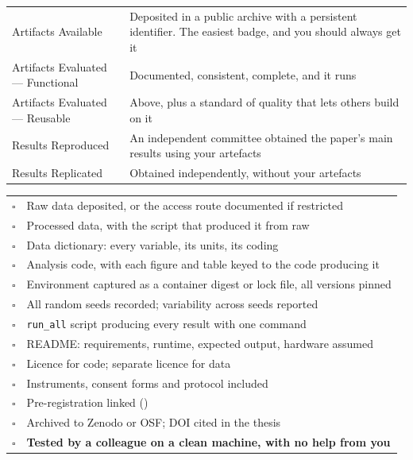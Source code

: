 \begin{center}
\small
\begin{tabular}{@{}L{4.2cm}L{10.1cm}@{}}
\toprule
Artifacts Available   & Deposited in a public archive with a persistent
                        identifier. The easiest badge, and you should always
                        get it \\
Artifacts Evaluated --- Functional & Documented, consistent, complete, and it
                        runs \\
Artifacts Evaluated --- Reusable & Above, plus a standard of quality that lets
                        others build on it \\
Results Reproduced    & An independent committee obtained the paper's main
                        results using your artefacts \\
Results Replicated    & Obtained independently, without your artefacts \\
\bottomrule
\end{tabular}
\end{center}

\begin{templatebox}
\begin{tabular}{@{}L{0.8cm}L{13.0cm}@{}}
$\square$ & Raw data deposited, or the access route documented if restricted \\
$\square$ & Processed data, with the script that produced it from raw \\
$\square$ & Data dictionary: every variable, its units, its coding \\
$\square$ & Analysis code, with each figure and table keyed to the code
            producing it \\
$\square$ & Environment captured as a container digest or lock file, all
            versions pinned \\
$\square$ & All random seeds recorded; variability across seeds reported \\
$\square$ & \texttt{run\_all} script producing every result with one command \\
$\square$ & README: requirements, runtime, expected output, hardware assumed \\
$\square$ & Licence for code; separate licence for data \\
$\square$ & Instruments, consent forms and protocol included \\
$\square$ & Pre-registration linked () \\
$\square$ & Archived to Zenodo or OSF; DOI cited in the thesis \\
$\square$ & \textbf{Tested by a colleague on a clean machine, with no help from
            you} \\
\end{tabular}
\end{templatebox}

